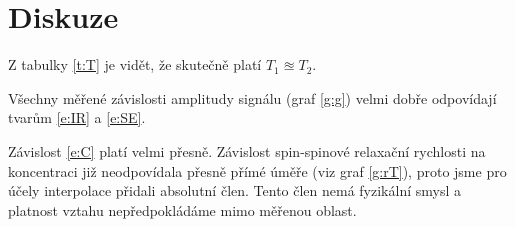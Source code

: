 \section*{Diskuze}
Z tabulky \ref{t:T} je vidět, že skutečně platí $T_1 \approxeq T_2$.

Všechny měřené závislosti amplitudy signálu (graf \ref{g:g}) velmi dobře odpovídají tvarům \eqref{e:IR} a \eqref{e:SE}.

Závislost \eqref{e:C} platí velmi přesně.
Závislost spin-spinové relaxační rychlosti na koncentraci již neodpovídala přesně přímé úměře (viz graf \ref{g:rT}), proto jsme pro účely interpolace přidali absolutní člen. Tento člen nemá fyzikální smysl a platnost vztahu nepředpokládáme mimo měřenou oblast.